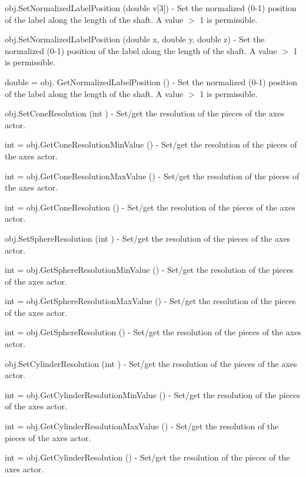 \begin{DoxyItemize}
\item {\ttfamily obj.\-Set\-Normalized\-Label\-Position (double v\mbox{[}3\mbox{]})} -\/ Set the normalized (0-\/1) position of the label along the length of the shaft. A value $>$ 1 is permissible.  
\item {\ttfamily obj.\-Set\-Normalized\-Label\-Position (double x, double y, double z)} -\/ Set the normalized (0-\/1) position of the label along the length of the shaft. A value $>$ 1 is permissible.  
\item {\ttfamily double = obj. Get\-Normalized\-Label\-Position ()} -\/ Set the normalized (0-\/1) position of the label along the length of the shaft. A value $>$ 1 is permissible.  
\item {\ttfamily obj.\-Set\-Cone\-Resolution (int )} -\/ Set/get the resolution of the pieces of the axes actor.  
\item {\ttfamily int = obj.\-Get\-Cone\-Resolution\-Min\-Value ()} -\/ Set/get the resolution of the pieces of the axes actor.  
\item {\ttfamily int = obj.\-Get\-Cone\-Resolution\-Max\-Value ()} -\/ Set/get the resolution of the pieces of the axes actor.  
\item {\ttfamily int = obj.\-Get\-Cone\-Resolution ()} -\/ Set/get the resolution of the pieces of the axes actor.  
\item {\ttfamily obj.\-Set\-Sphere\-Resolution (int )} -\/ Set/get the resolution of the pieces of the axes actor.  
\item {\ttfamily int = obj.\-Get\-Sphere\-Resolution\-Min\-Value ()} -\/ Set/get the resolution of the pieces of the axes actor.  
\item {\ttfamily int = obj.\-Get\-Sphere\-Resolution\-Max\-Value ()} -\/ Set/get the resolution of the pieces of the axes actor.  
\item {\ttfamily int = obj.\-Get\-Sphere\-Resolution ()} -\/ Set/get the resolution of the pieces of the axes actor.  
\item {\ttfamily obj.\-Set\-Cylinder\-Resolution (int )} -\/ Set/get the resolution of the pieces of the axes actor.  
\item {\ttfamily int = obj.\-Get\-Cylinder\-Resolution\-Min\-Value ()} -\/ Set/get the resolution of the pieces of the axes actor.  
\item {\ttfamily int = obj.\-Get\-Cylinder\-Resolution\-Max\-Value ()} -\/ Set/get the resolution of the pieces of the axes actor.  
\item {\ttfamily int = obj.\-Get\-Cylinder\-Resolution ()} -\/ Set/get the resolution of the pieces of the axes actor.  

\end{DoxyItemize}
